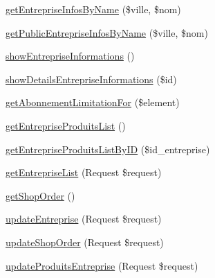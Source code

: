 \begin{DoxyCompactItemize}
\item 
\mbox{\hyperlink{class_app_1_1_http_1_1_controllers_1_1_entreprise_informations_controller_a5a8af4cadf7d3e138761fb374c2103ff}{get\+Entreprise\+Infos\+By\+Name}} (\$ville, \$nom)
\item 
\mbox{\hyperlink{class_app_1_1_http_1_1_controllers_1_1_entreprise_informations_controller_a930089b0f7a16da328653f7545736f08}{get\+Public\+Entreprise\+Infos\+By\+Name}} (\$ville, \$nom)
\item 
\mbox{\hyperlink{class_app_1_1_http_1_1_controllers_1_1_entreprise_informations_controller_a950c1fd1ed8889de2564c0e8bcd4e3b0}{show\+Entreprise\+Informations}} ()
\item 
\mbox{\hyperlink{class_app_1_1_http_1_1_controllers_1_1_entreprise_informations_controller_a584280e77f2858cddb1d7f7b5483a04a}{show\+Details\+Entreprise\+Informations}} (\$id)
\item 
\mbox{\hyperlink{class_app_1_1_http_1_1_controllers_1_1_entreprise_informations_controller_ab2e0553690cb869716d59d8a05e40461}{get\+Abonnement\+Limitation\+For}} (\$element)
\item 
\mbox{\hyperlink{class_app_1_1_http_1_1_controllers_1_1_entreprise_informations_controller_a819e9df924574c92550f4aa406d76b45}{get\+Entreprise\+Produits\+List}} ()
\item 
\mbox{\hyperlink{class_app_1_1_http_1_1_controllers_1_1_entreprise_informations_controller_aea7c9f6380e22ab6649d8d14a7c5d1c4}{get\+Entreprise\+Produits\+List\+By\+ID}} (\$id\+\_\+entreprise)
\item 
\mbox{\hyperlink{class_app_1_1_http_1_1_controllers_1_1_entreprise_informations_controller_a2bf9b1b8a729682c9ba6b36f164cde93}{get\+Entreprise\+List}} (Request \$request)
\item 
\mbox{\hyperlink{class_app_1_1_http_1_1_controllers_1_1_entreprise_informations_controller_a45217f183851dfe358e19ca9ac12d85c}{get\+Shop\+Order}} ()
\item 
\mbox{\hyperlink{class_app_1_1_http_1_1_controllers_1_1_entreprise_informations_controller_a4203ff113dc58ab01a32c1abb4254bec}{update\+Entreprise}} (Request \$request)
\item 
\mbox{\hyperlink{class_app_1_1_http_1_1_controllers_1_1_entreprise_informations_controller_a616c327d412655a1aaf4972a20a00454}{update\+Shop\+Order}} (Request \$request)
\item 
\mbox{\hyperlink{class_app_1_1_http_1_1_controllers_1_1_entreprise_informations_controller_a191c5136c46202b748a55347b13591a8}{update\+Produits\+Entreprise}} (Request \$request)

\end{DoxyCompactItemize}
